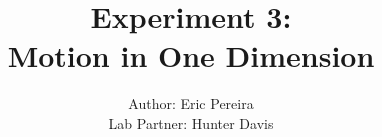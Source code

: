 \documentclass[]{report}
\title{Experiment 3: \\ Motion in One Dimension}
\author{Author: Eric Pereira \\ Lab Partner: Hunter Davis}
\begin{document}
\maketitle

\begin{abstract}	
\end{abstract}
\end{document}
